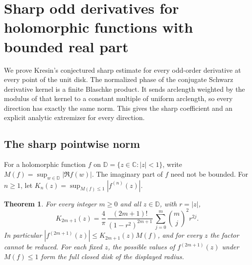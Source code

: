 \documentclass[11pt,a4paper]{article}
\numberwithin{equation}{section}
\newtheorem{theorem}{Theorem}[section]
\theoremstyle{definition}
\theoremstyle{remark}
\newenvironment{sectionabstract}{\par\smallskip\begingroup\small\noindent}{\par\endgroup\medskip}
\begin{document}
\par\endgroup

\begingroup
\newcommand{\D}{\mathbb D}
\newcommand{\T}{\mathbb T}
\newcommand{\R}{\mathbb R}
\section{\texorpdfstring{Sharp odd derivatives for holomorphic functions with bounded real part}{Sharp odd derivatives for holomorphic functions with bounded real part}}\label{section:r32heisei}
\par\medskip


\begin{sectionabstract}
We prove Kresin's conjectured sharp estimate for every odd-order derivative at every point of the unit disk. The normalized phase of the conjugate Schwarz derivative kernel is a finite Blaschke product. It sends arclength weighted by the modulus of that kernel to a constant multiple of uniform arclength, so every direction has exactly the same norm. This gives the sharp coefficient and an explicit analytic extremizer for every direction.
\end{sectionabstract}

\subsection{The sharp pointwise norm}
For a holomorphic function $f$ on $\D=\{z\in\mathbb C:|z|<1\}$, write $M(f)=\sup_{w\in\D}|\Re f(w)|$. The imaginary part of $f$ need not be bounded. For $n\ge1$, let $K_n(z)=\sup_{M(f)\le1}|f^{(n)}(z)|$.

\begin{theorem}\label{r32heisei:main}
For every integer $m\ge0$ and all $z\in\D$, with $r=|z|$,
\[
 K_{2m+1}(z)=\frac{4}{\pi}\,\frac{(2m+1)!}{(1-r^2)^{2m+1}}\,
                  \sum_{j=0}^m\binom{m}{j}^{\!2}r^{2j}.
\]
In particular $|f^{(2m+1)}(z)|\le K_{2m+1}(z)M(f)$, and for every $z$ the factor cannot be reduced. For each fixed $z$, the possible values of $f^{(2m+1)}(z)$ under $M(f)\le1$ form the full closed disk of the displayed radius.
\end{theorem}
\end{document}
